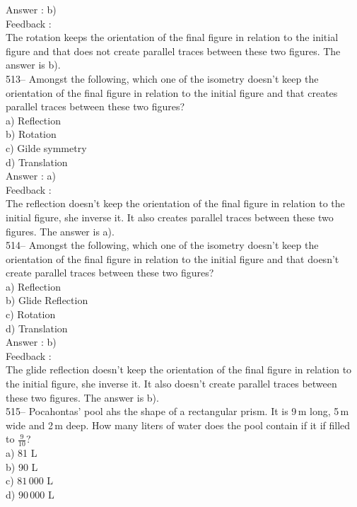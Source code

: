 ﻿\documentclass[letterpaper, 12pt]{article}
\begin{document}
Answer : b)\\

Feedback :\\
The rotation keeps the orientation of the final figure in relation to the initial figure and that does not create parallel traces between these two figures. The answer is b).\\

513--  Amongst the following, which one of the isometry doesn't keep the orientation of the final figure in relation to the initial figure and that creates parallel traces between these two figures?\\
a) Reflection\\
b) Rotation\\
c) Gilde symmetry\\
d) Translation\\

Answer : a)\\

Feedback :\\
The reflection doesn't keep the orientation of the final figure in relation to the initial figure, she inverse it. It also creates parallel traces between these two figures. The answer is a).\\

514--  Amongst the following, which one of the isometry doesn't keep the orientation of the final figure in relation to the initial figure and that doesn't create parallel traces between these two figures? \\
a) Reflection\\
b) Glide Reflection\\
c) Rotation\\
d) Translation\\

Answer : b)\\

Feedback :\\
The glide reflection doesn't keep the orientation of the final figure in relation to the initial figure, she inverse it. It also doesn't create parallel traces between these two figures. The answer is b).\\

515-- Pocahontas' pool ahs the shape of a rectangular prism. It is 9\,m long, 5\,m wide and 2\,m deep. How many liters of water does the pool contain if it if filled to $\frac{9}{10}$?\\
a) 81 L\\
b) 90 L\\
c) $81\,000$ L\\
d) $90\,000$ L\\
\end{document}
